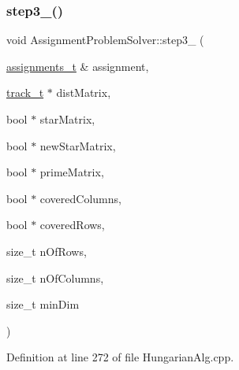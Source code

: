 \subsubsection{\texorpdfstring{step3\+\_()}{step3\_5()}}
{\footnotesize\ttfamily void Assignment\+Problem\+Solver\+::step3\+\_ (\begin{DoxyParamCaption}\item[{\mbox{\hyperlink{_hungarian_alg_8h_ad7b9f569a9adbd958c668a36b6884ffd}{assignments\+\_\+t}} \&}]{assignment,  }\item[{\mbox{\hyperlink{defines_8h_a7ce9c8817b42ab418e61756f579549ab}{track\+\_\+t}} $\ast$}]{dist\+Matrix,  }\item[{bool $\ast$}]{star\+Matrix,  }\item[{bool $\ast$}]{new\+Star\+Matrix,  }\item[{bool $\ast$}]{prime\+Matrix,  }\item[{bool $\ast$}]{covered\+Columns,  }\item[{bool $\ast$}]{covered\+Rows,  }\item[{size\+\_\+t}]{n\+Of\+Rows,  }\item[{size\+\_\+t}]{n\+Of\+Columns,  }\item[{size\+\_\+t}]{min\+Dim }\end{DoxyParamCaption})\hspace{0.3cm}{\ttfamily [private]}}



Definition at line 272 of file Hungarian\+Alg.\+cpp.


